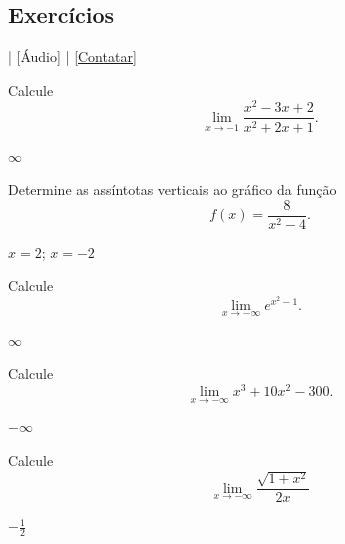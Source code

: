 \subsection*{Exercícios}

\begin{flushright}
  [Vídeo] | [Áudio] | \href{https://phkonzen.github.io/notas/contato.html}{[Contatar]}
\end{flushright}

\begin{exer}
  Calcule
  \begin{equation}
    \lim_{x\to -1} \frac{x^2 - 3x + 2}{x^2 + 2x + 1}.
  \end{equation}
\end{exer}
\begin{resp}
  $\infty$
\end{resp}

\begin{exer}
  Determine as assíntotas verticais ao gráfico da função
  \begin{equation}
    f(x) = \frac{8}{x^2-4}.
  \end{equation}
\end{exer}
\begin{resp}
  $x=2$; $x=-2$
\end{resp}

\begin{exer}
  Calcule
  \begin{equation}
    \lim_{x\to -\infty} e^{x^2-1}.
  \end{equation}
\end{exer}
\begin{resp}
  $\infty$
\end{resp}

\begin{exer}
  Calcule
  \begin{equation}
    \lim_{x\to -\infty} x^3 + 10x^2 - 300.
  \end{equation}
\end{exer}
\begin{resp}
  $-\infty$
\end{resp}

\begin{exer}
  Calcule
  \begin{equation}
    \lim_{x\to -\infty}\frac{\sqrt{1+x^2}}{2x}
  \end{equation}
\end{exer}
\begin{resp}
  $-\frac{1}{2}$
\end{resp}


